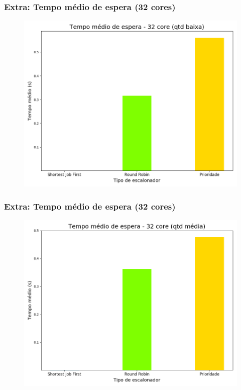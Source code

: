 \documentclass{beamer}
\begin{document}
\begin{frame}
\frametitle{Extra: Tempo médio de espera (32 cores)}
\begin{figure}
\includegraphics[scale=0.4]{avgwt_small_32.png}
\end{figure}
\end{frame}
\begin{frame}
\frametitle{Extra: Tempo médio de espera (32 cores)}
\begin{figure}
\includegraphics[scale=0.4]{avgwt_med_32.png}
\end{figure}
\end{frame}
\end{document}
